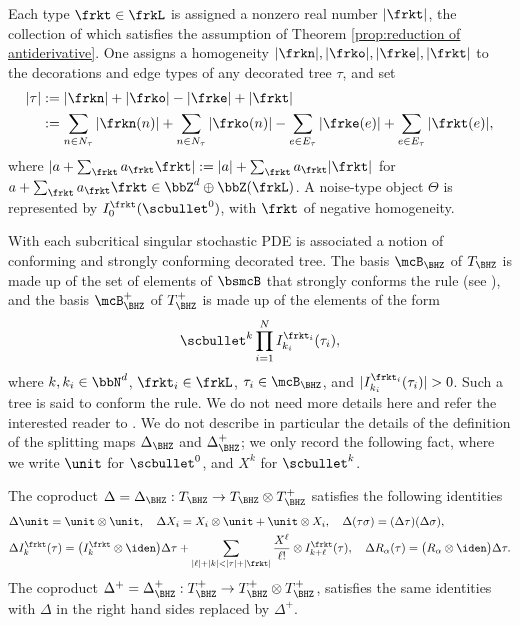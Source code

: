 Each type $\frkt\in\frkL$ is assigned a nonzero real number $|\frkt|$, the collection of which satisfies the assumption of Theorem \ref{prop:reduction of antiderivative}. One assigns a homogeneity $\vert\frkn\vert, \vert\frko\vert, \vert\frke\vert, \vert\frkt\vert$ to the decorations and edge types of any decorated tree $\tau$, and set
\begin{align*}
\vert\tau\vert &:= \vert\frkn\vert + \vert\frko\vert - \vert\frke\vert + \vert\frkt\vert\\
&:=\sum_{n\in N_\tau}|\frkn(n)|+\sum_{n\in N_\tau}|\frko(n)|-\sum_{e\in E_\tau}|\frke(e)|+\sum_{e\in E_\tau}|\frkt(e)|,
\end{align*}
where $|a+\sum_{\frkt}a_\frkt\frkt|:=|a|+\sum_{\frkt}a_\frkt|\frkt|$ for $a+\sum_{\frkt}a_{\frkt}\frkt\in\bbZ^d\oplus\bbZ(\frkL)$.
A noise-type object $\Theta$ is represented by $I_0^{\frkt}(\scbullet^0)$, with $\frkt$ of negative homogeneity.

With each subcritical singular stochastic PDE is associated a notion of conforming and strongly conforming decorated tree. The basis $\mcB_{\BHZ}$ of $T_{\BHZ}$ is made up of the set of elements of $\bsmcB$ that strongly conforms the rule (see \cite[\S5]{BHZ}), and the basis $\mcB_{\BHZ}^+$ of $T_{\BHZ}^+$ is made up of the elements of the form
\[
\scbullet^k\prod_{i=1}^NI_{k_i}^{\frkt_i}(\tau_i),
\]
where $k,k_i\in\bbN^d$, $\frkt_i\in\frkL$, $\tau_i\in\mcB_{\BHZ}$, and $|I_{k_i}^{\frkt_i}(\tau_i)|>0$.
Such a tree is said to conform the rule. We do not need more details here and refer the interested reader to \cite[\S5]{BHZ}. We do not describe in particular the details of the definition of the splitting maps $\Delta_\BHZ$ and $\Delta^+_\BHZ$; we only record the following fact, where we write $\unit$ for $\scbullet^0$, and $X^k$ for $\scbullet^k$.

\begin{prop}\label{recursive def of Delta}
The coproduct $\Delta=\Delta_{\BHZ}:T_\BHZ\to T_\BHZ\otimes T^+_\BHZ$ satisfies the following identities
\begin{align*}
&\Delta\unit=\unit\otimes\unit,\quad \Delta X_i=X_i\otimes\unit+\unit\otimes X_i,\quad \Delta(\tau\sigma)=(\Delta\tau)(\Delta\sigma), \\
&\Delta I_k^\frkt(\tau) = \bigl(I_k^\frkt\otimes\iden\bigr)\Delta\tau + \sum_{\vert\ell\vert+\vert k\vert <\vert \tau\vert+\vert\frkt\vert}\frac{X^\ell}{\ell!}\otimes I_{k+\ell}^\frkt(\tau),\quad
\Delta R_\alpha(\tau) = \bigl(R_\alpha\otimes\iden\bigr)\Delta\tau.
\end{align*}
The coproduct $\Delta^+=\Delta_{\BHZ}^+:T^+_\BHZ\to T^+_\BHZ\otimes T^+_\BHZ$, satisfies the same identities with $\Delta$ in the right hand sides replaced by $\Delta^+$.
\end{prop}

